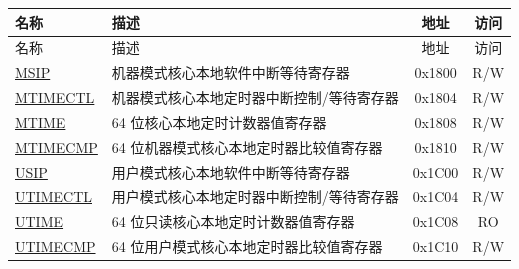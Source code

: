 
\begin{longtable}{ | p{4.0cm} | p{8.4cm} | c | c| }
\hline\rowcolor{lightgray}
名称 & 描述 & 地址 & 访问 \\ \hline
\endfirsthead
\hline
\rowcolor{lightgray}
名称 & 描述 & 地址 & 访问  \\
\hline
\endhead
\endfoot

\hyperref[regdesc:CLINTMSIPREG] {MSIP} & 机器模式核心本地软件中断等待寄存器 & 0x1800 & R/W \\\hline
\hyperref[regdesc:CLINTMTIMECTLREG] {MTIMECTL} & 机器模式核心本地定时器中断控制/等待寄存器 & 0x1804 & R/W \\\hline
\hyperref[regdesc:CLINTMTIMEREG] {MTIME} & 64 位核心本地定时计数器值寄存器 & 0x1808 & R/W \\\hline
\hyperref[regdesc:CLINTMTIMECMPREG] {MTIMECMP} & 64 位机器模式核心本地定时器比较值寄存器 & 0x1810 & R/W \\\hline
\hyperref[regdesc:CLINTUSIPREG] {USIP} & 用户模式核心本地软件中断等待寄存器 & 0x1C00 & R/W \\\hline
\hyperref[regdesc:CLINTUTIMECTLREG] {UTIMECTL} & 用户模式核心本地定时器中断控制/等待寄存器 & 0x1C04 & R/W \\\hline
\hyperref[regdesc:CLINTUTIMEREG] {UTIME} & 64 位只读核心本地定时计数器值寄存器 & 0x1C08 & RO \\\hline
\hyperref[regdesc:CLINTUTIMECMPREG] {UTIMECMP} & 64 位用户模式核心本地定时器比较值寄存器 & 0x1C10 & R/W \\\hline
\end{longtable}
